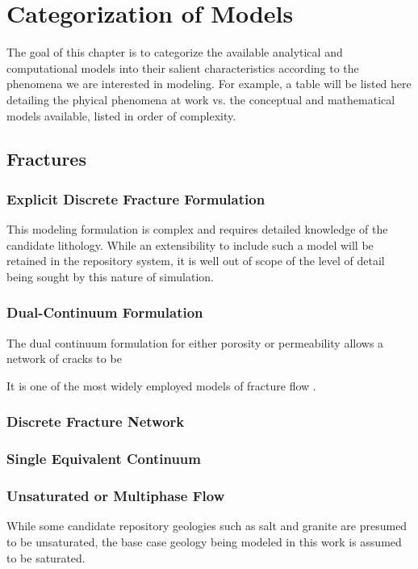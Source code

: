 \chapter{Categorization of Models}\label{ch:categorization}

The goal of this chapter is to categorize the available analytical and 
computational models into their salient characteristics according to the 
phenomena we are interested in modeling. For example, a table will be listed 
here detailing the phyical phenomena at work vs. the conceptual and 
mathematical models available, listed in order of complexity.




\section{Fractures}

\subsection{Explicit Discrete Fracture Formulation}

This modeling formulation is complex and requires detailed knowledge of the 
candidate lithology. While an extensibility to include such a model will be 
retained in the repository system, it is well out of scope of the level of 
detail being sought by this nature of simulation. 

\subsection{Dual-Continuum Formulation}

The dual continuum formulation for either porosity or permeability allows a 
network of cracks to be  

It is one of the most widely employed models of fracture flow 
\cite{diodato_compendium_1994}.

\subsection{Discrete Fracture Network}
\subsection{Single Equivalent Continuum}

\subsection{Unsaturated or Multiphase Flow}
While some candidate repository geologies such as salt and granite are presumed 
to be unsaturated, the base case geology being modeled in this work is assumed 
to be saturated.


